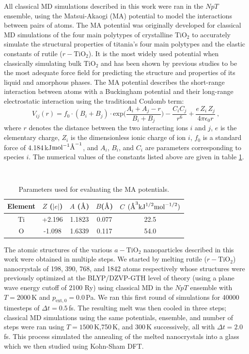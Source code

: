 \documentclass[aps,prb,twocolumn,amsmath,amssymb,superscriptaddress,longbibliography]{revtex4-1}
\newcommand{\angstrom}{\text{\normalfont\AA}}
\newcommand\tab[1][1cm]{\hspace*{#1}} %
\begin{document}
\tab All classical MD simulations described in this work were ran in the $NpT$ ensemble, using the Matsui-Akaogi (MA) potential to model the interactions between pairs of atoms.
The MA potential was originally developed for classical MD simulations of the four main polytypes of crystalline $\text{TiO}_2$\cite{MA_og} to accurately simulate the structural properties of titania's four main polytypes and the elastic constants of rutile ($r-\text{TiO}_2$). 
It is the most widely used potential when classically simulating bulk $\text{TiO}_2$ and has been shown by previous studies\cite{smith_collins,fichtorn,vvh2007} to be the most adequate force field for predicting the structure and properties of its liquid and amorphous phases.
The MA potential describes the short-range interaction between atoms with a Buckingham potential and their long-range electrostatic interaction using the traditional Coulomb term:
\begin{equation}
V_{ij}(r) = f_{0}\cdot (B_i+B_j)\cdot\text{exp}\big(\frac{A_i + A_j - r}{B_i + B_j}\big) - \frac{C_{i}C_j}{r^6} + \frac{e\,Z_i\,Z_j}{4\pi\epsilon_0 r}\: ,
\end{equation}
where $r$ denotes the distance between the two interacting ions $i$ and $j$, $e$ is the elementary charge, $Z_i$ is the dimensionless ionic charge of ion $i$, $f_0$ is a standard force of 4.184$\,$kJ$\text{mol}^{-1}\angstrom^{-1}$, and $A_i$, $B_i$, and $C_i$ are parameters corresponding to species $i$.
The numerical values of the constants listed above are given in table \ref{classpot}.

\begin{table}[]
\centering
\caption{Parameters used for evaluating the MA potentials.}
\label{classpot}
\
\begin{tabular}{ccccc}
\hline
Element & $Z$ ($|e|$) & $A$ ($\angstrom$) & $B$($\angstrom$) & $C$ $(\angstrom^3\text{kJ}^{1/2}\text{mol}^{-1/2})$ \\ \hline
Ti      & +2.196      & 1.1823            & 0.077            & 22.5                                                \\
O       & -1.098      & 1.6339            & 0.117            & 54.0                                                \\ \hline
\end{tabular}
\end{table}

\tab The atomic structures of the various $a-\text{TiO}_2$ nanoparticles described in this work were obtained in multiple steps.
We started by melting rutile ($r-\text{TiO}_2$) nanocrystals of 198, 390, 768, and 1842 atoms respectively whose structures were previously optimized at the BLYP/DZVP-GTH level of theory (using a plane wave energy cutoff of 2100 Ry) using classical MD in the $NpT$ ensemble with $T = 2000\,$K and $p_{\text{ext},0} = 0.0\,$Pa. 
We ran this first round of simulations for 40000 timesteps of $\Delta t = 0.5\,$fs.
The resulting melt was then cooled in three steps; classical MD simulations using the same potentials, ensemble, and number of steps were ran using $T = 1500\,$K,750$\,$K, and 300$\,$K successively, all with $\Delta t = 2.0\,$fs.
This process simulated the annealing of the melted nanocrystals into a glass which we then studied using Kohn-Sham DFT.
\end{document}
